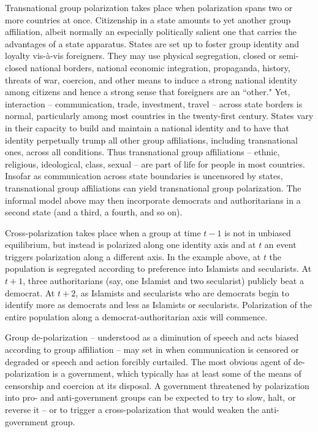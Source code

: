 \documentclass[12pt]{article}
\begin{document}
Transnational group polarization takes place when polarization spans two or more countries at once.  Citizenship in a state amounts to yet another group affiliation, albeit normally an especially politically salient one that carries the advantages of a state apparatus.  States are set up to foster group identity and loyalty vis-à-vis foreigners.  They may use physical segregation, closed or semi-closed national borders, national economic integration, propaganda, history, threats of war, coercion, and other means to induce a strong national identity among citizens and hence a strong sense that foreigners are an ``other."  Yet, interaction – communication, trade, investment, travel – across state borders is normal, particularly among most countries in the twenty-first century.   States vary in their capacity to build and maintain a national identity and to have that identity perpetually trump all other group affiliations, including transnational ones, across all conditions.   Thus transnational group affiliations – ethnic, religious, ideological, class, sexual – are part of life for people in most countries.  Insofar as communication across state boundaries is uncensored by states, transnational group affiliations can yield transnational group polarization.  The informal model above may then incorporate democrats and authoritarians in a second state (and a third, a fourth, and so on).

Cross-polarization takes place when a group at time $t-1$ is not in unbiased equilibrium, but instead is polarized along one identity axis and at $t$ an event triggers polarization along a different axis.  In the example above, at $t$ the population is segregated according to preference into Islamists and secularists.  At $t+1$, three authoritarians (say, one Islamist and two secularist) publicly beat a democrat.  At $t+2$, as Islamists and secularists who are democrats begin to identify more as democrats and less as Islamists or secularists.  Polarization of the entire population along a democrat-authoritarian axis will commence.

Group de-polarization – understood as a diminution of speech and acts biased according to group affiliation – may set in when communication is censored or degraded or speech and action forcibly curtailed.  The most obvious agent of de-polarization is a government, which typically has at least some of the means of censorship and coercion at its disposal.  A government threatened by polarization into pro- and anti-government groups can be expected to try to slow, halt, or reverse it – or to trigger a cross-polarization that would weaken the anti-government group.  
\end{document}
